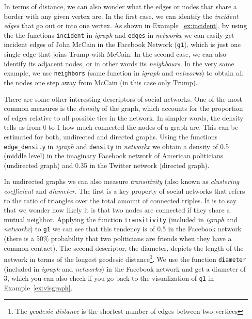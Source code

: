 
In terms of distance, we can also wonder what  the edges or nodes that share a border with any given vertex are. In the first case, we can identify the \emph{incident edges} that go out or into one vertex. As shown in Example~\ref{ex:incident}, by using the the functions \texttt{incident} in \emph{igraph} and \texttt{edges} in \emph{networkx} we can easily get incident edges of John McCain in the Facebook Network (\texttt{g1}), which is just one single edge that joins Trump with McCain. In the second case, we can also identify its adjacent nodes, or in other words its \emph{neighbours}. In the very same example, we use \texttt{neighbors} (same function in \emph{igraph} and \emph{networkx}) to obtain all the nodes one step away from McCain (in this case only Trump).


There are some other interesting descriptors of social networks. One of the most common measures is the \emph{density} of the graph, which accounts for the proportion of edges relative to all possible ties in the network. In simpler words, the density tells us from 0 to 1 how much connected the nodes of a graph are. This can be estimated for both, undirected and directed graphs. Using the functions \texttt{edge\_density} in \emph{igraph} and \texttt{density} in \emph{networkx} we obtain a density of 0.5 (middle level) in the imaginary Facebook network of American politicians (undirected graph) and 0.35 in the Twitter network (directed graph).

In undirected graphs we can also measure \emph{transitivity} (also known as \emph{clustering coefficient} and \emph{diameter}. The first is a key property of social networks that refers to the ratio of triangles over the total amount of connected triples. It is to say that we wonder how likely it is that two nodes are connected if they share a mutual neighbor. Applying the function \texttt{transitivity} (included in \emph{igraph} and \emph{networkx}) to \texttt{g1} we can see that this tendency is of 0.5 in the Facebook network (there is a 50\% probability that two politicians
are friends when they have a common contact). The second descriptor, the diameter, depicts the length of the network in terms of the longest geodesic distance\footnote{The \emph{geodesic distance} is the shortest number of edges between two vertices}. We use the function \texttt{diameter} (included in \emph{igraph} and \emph{networkx}) in the Facebook network and get a diameter of 3, which you can also check if you go back to the visualization of \texttt{g1} in Example~\ref{ex:visgraph}.

